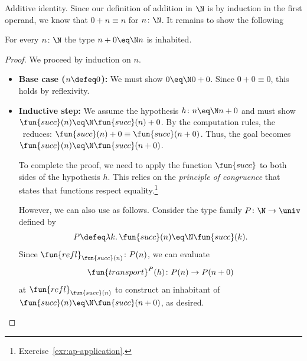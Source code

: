 \begin{lpar}{Additive identity.}\label{lpar:additive-identity}
    Since our definition of addition in $\N$ is by induction in the first operand, we know that $0+n\equiv n$ for $n\colon\N$. It remains to show the following
    
    \begin{lem}
        For every $n\colon\N$ the type $n+0\eq\N n$ is inhabited.
    \end{lem}

    \begin{proof} We proceed by induction on $n$.
    \begin{itemize}
        \item \textbf{Base case ($n\defeq0$):} We must show $0 \eq\N 0 + 0$. Since $0+0\equiv0$, this holds by reflexivity.
        \item \textbf{Inductive step:} We assume the hypothesis $h\colon n \eq\N n+0$ and must show $\fun{succ}(n) \eq\N \fun{succ}(n)+0$.
        By the computation rules, the \rhs\ reduces: $\fun{succ}(n)+0 \equiv \fun{succ}(n+0)$.
        Thus, the goal becomes $\fun{succ}(n) \eq\N \fun{succ}(n+0)$.

        To complete the proof, we need to apply the function $\fun{succ}$ to both sides of the hypothesis $h$. This relies on the \textit{principle of congruence} that states that functions respect equality.\footnote{Exercise~\ref{exr:ap-application}.}
        
        However, we can also use  as follows. Consider the type family $P\colon\N\to\univ$ defined by
        \[
            P\defeq\lambda k.\,\fun{succ}(n)\eq\N\fun{succ}(k).
        \]
        Since $\fun{refl}_{\fun{succ}(n)}\colon P(n)$, we can evaluate 
        \[
            \fun{transport}^P(h)\colon P(n)\to P(n+0)
        \]
        at $\fun{refl}_{\fun{succ}(n)}$ to construct an inhabitant of $\fun{succ}(n)\eq\N\fun{succ}(n+0)$, as desired. 
    \end{itemize}        
    \end{proof}
\end{lpar}

